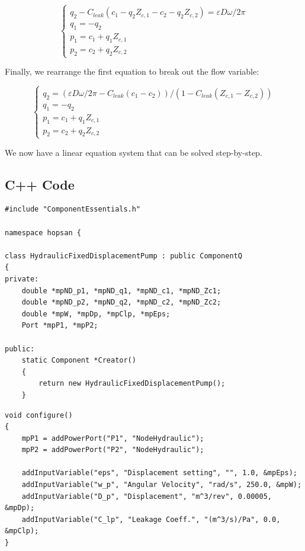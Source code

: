 \documentclass[a4paper,pdftex]{article}
\begin{document}
\begin{equation*}
\begin{cases}
q_{2} - C_{leak}(c_{1} - q_{2}Z_{c,1}-c_{2} - q_{2}Z_{c,2}) = \varepsilon D \omega/2\pi \\
q_{1} = -q_{2}\\
p_{1} = c_{1} + q_{1}Z_{c,1}\\
p_{2} = c_{2} + q_{2}Z_{c,2}
\end{cases}
\end{equation*}

Finally, we rearrange the first equation to break out the flow variable:

\begin{equation*}
\begin{cases}
q_{2} = (\varepsilon D \omega/2\pi - C_{leak}(c_{1} -c_{2})) / (1-C_{leak}(Z_{c,1}-Z_{c,2}))\\
q_{1} = -q_{2}\\
p_{1} = c_{1} + q_{1}Z_{c,1}\\
p_{2} = c_{2} + q_{2}Z_{c,2}
\end{cases}
\end{equation*}

We now have a linear equation system that can be solved step-by-step. 

\subsection*{C++ Code}

\begin{minipage}{\linewidth}
\begin{lstlisting}[basicstyle=\footnotesize\ttfamily]
#include "ComponentEssentials.h"

namespace hopsan {

class HydraulicFixedDisplacementPump : public ComponentQ
{
private:
    double *mpND_p1, *mpND_q1, *mpND_c1, *mpND_Zc1; 
    double *mpND_p2, *mpND_q2, *mpND_c2, *mpND_Zc2;
    double *mpW, *mpDp, *mpClp, *mpEps;
    Port *mpP1, *mpP2;

public:
    static Component *Creator()
    {
        return new HydraulicFixedDisplacementPump();
    }
\end{lstlisting}
\end{minipage}

\begin{minipage}{\linewidth}
\begin{lstlisting}[basicstyle=\footnotesize\ttfamily]
void configure()
{
    mpP1 = addPowerPort("P1", "NodeHydraulic");
    mpP2 = addPowerPort("P2", "NodeHydraulic");

	addInputVariable("eps", "Displacement setting", "", 1.0, &mpEps);
    addInputVariable("w_p", "Angular Velocity", "rad/s", 250.0, &mpW);
    addInputVariable("D_p", "Displacement", "m^3/rev", 0.00005, &mpDp);
    addInputVariable("C_lp", "Leakage Coeff.", "(m^3/s)/Pa", 0.0, &mpClp);
}
\end{lstlisting}
\end{minipage}
\end{document}
